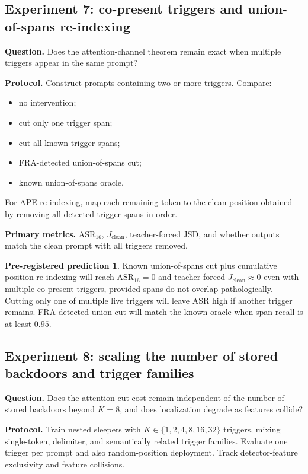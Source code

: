 \documentclass[11pt]{article}
\newcommand{\ASR}{\mathrm{ASR}_{16}}
\newcommand{\Jclean}{J_{\mathrm{clean}}}
\theoremstyle{definition}
\newtheorem{prediction}{Pre-registered prediction}
\theoremstyle{plain}
\theoremstyle{remark}
\begin{document}
\subsection{Experiment 7: co-present triggers and union-of-spans re-indexing}

\textbf{Question.} Does the attention-channel theorem remain exact when multiple
triggers appear in the same prompt?

\textbf{Protocol.}
Construct prompts containing two or more triggers.  Compare:
\begin{itemize}
    \item no intervention;
    \item cut only one trigger span;
    \item cut all known trigger spans;
    \item FRA-detected union-of-spans cut;
    \item known union-of-spans oracle.
\end{itemize}
For APE re-indexing, map each remaining token to the clean position obtained by
removing all detected trigger spans in order.

\textbf{Primary metrics.} $\ASR$, $\Jclean$, teacher-forced JSD, and whether outputs
match the clean prompt with all triggers removed.

\begin{prediction}
Known union-of-spans cut plus cumulative position re-indexing will reach $\ASR=0$
and teacher-forced $\Jclean\approx 0$ even with multiple co-present triggers, provided
spans do not overlap pathologically.  Cutting only one of multiple live triggers will
leave ASR high if another trigger remains.  FRA-detected union cut will match the
known oracle when span recall is at least $0.95$.
\end{prediction}

\subsection{Experiment 8: scaling the number of stored backdoors and trigger families}

\textbf{Question.} Does the attention-cut cost remain independent of the number of
stored backdoors beyond $K=8$, and does localization degrade as features collide?

\textbf{Protocol.}
Train nested sleepers with $K\in\{1,2,4,8,16,32\}$ triggers, mixing single-token,
delimiter, and semantically related trigger families.  Evaluate one trigger per
prompt and also random-position deployment.  Track detector-feature exclusivity and
feature collisions.
\end{document}
